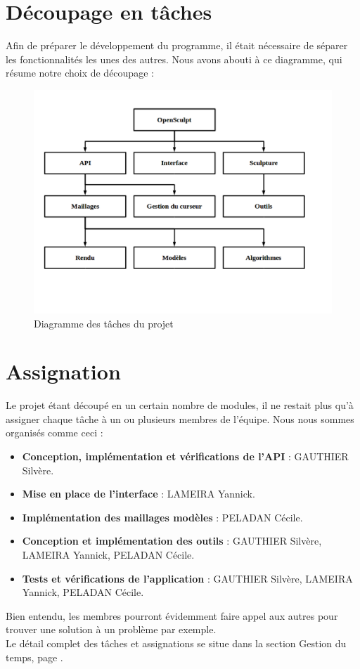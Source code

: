 \documentclass[a4paper]{memoir}
\begin{document}
		\section{Découpage en tâches}
			Afin de préparer le développement du programme, il était nécessaire de séparer les fonctionnalités les unes des autres. Nous avons abouti à ce 
			diagramme, qui résume notre choix de découpage :\\
			\begin{figure}[H]
				\begin{center}
					\includegraphics[scale=0.5]{img/DiagrammeDecoupageProjet.png}
				\end{center}
				\label{fig:decoupage}
				\caption{Diagramme des tâches du projet}
			\end{figure}

		\section{Assignation}
			Le projet étant découpé en un certain nombre de modules, il ne restait plus qu'à assigner chaque tâche à un ou plusieurs membres de l'équipe. 
			Nous nous sommes organisés comme ceci :
			\begin{itemize}[label=$\bullet$]
				\item \textbf{Conception, implémentation et vérifications de l'API} : GAUTHIER Silvère.
				\item \textbf{Mise en place de l'interface} : LAMEIRA Yannick.
				\item \textbf{Implémentation des maillages modèles} : PELADAN Cécile.
				\item \textbf{Conception et implémentation des outils} : GAUTHIER Silvère, LAMEIRA Yannick, PELADAN Cécile.
				\item \textbf{Tests et vérifications de l'application} : GAUTHIER Silvère, LAMEIRA Yannick, PELADAN Cécile.
			\end{itemize}
			Bien entendu, les membres pourront évidemment faire appel aux autres pour trouver une solution à un problème par exemple.\\
			Le détail complet des tâches et assignations se situe dans la section Gestion du temps, page \pageref{GestionTps}.
\end{document}
